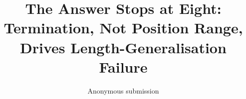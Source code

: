 \documentclass[10pt]{article}
\title{\vspace{-1.2em}\bfseries The Answer Stops at Eight:\\ Termination, Not Position Range, Drives Length-Generalisation Failure}
\author{Anonymous submission}
\date{}
\theoremstyle{definition}
\begin{document}
\maketitle

\begin{abstract}

\end{abstract}












\end{document}
